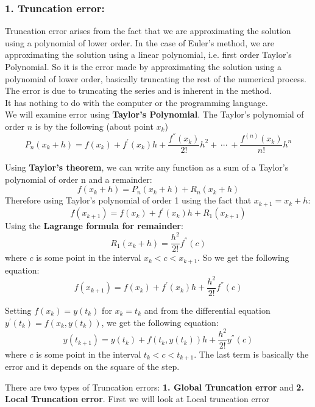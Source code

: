 \documentclass[11pt,a4paper]{amsart}
\begin{document}
\subsubsection*{1. Truncation error: \cite{buchanan, burden}}
Truncation error arises from the fact that we are approximating the solution using a polynomial of lower order. In the case of Euler's method, we are approximating the solution using a linear polynomial, i.e. first order Taylor's Polynomial.
So it is the error made by approximating the solution using a polynomial of lower order, basically truncating the rest of the numerical process. The error is due to truncating the series and is inherent in the method.\\ It has nothing to do with the computer or the programming language.\\
We will examine error using {\bf Taylor's Polynomial}. The Taylor's polynomial of order $n$ is by the following (about point $x_k$)\cite{thomas, burden}
$$P_n(x_k + h) = f(x_k) + f^{'}(x_k)h + \frac{f^{''}(x_k)}{2!}h^2 + \ \cdots \ + \frac{f^{(n)}(x_k)}{n!}h^n$$

Using {\bf Taylor's theorem}, we can write any function as a sum of a Taylor's polynomial of order n and a remainder:
$$f(x_k + h) = P_n(x_k + h) + R_n(x_k + h)$$
Therefore using Taylor's polynomial of order 1 using the fact that $x_{k+1} = x_k + h$:
$$f(x_{k + 1}) = f(x_k) + f^{'}(x_k)h + R_1(x_{k+1})$$
Using the {\bf Lagrange formula for remainder}\cite{thomas}:
$$R_1(x_k + h) = \frac{h^2}{2!}f^{''}(c)$$
where $c$ is some point in the interval $x_k < c < x_{k+1}$. 
So we get the following equation:
$$f(x_{k + 1}) = f(x_k) + f^{'}(x_k)h + \frac{h^2}{2!}f^{''}(c)$$

Setting $f(x_k) = y(t_k)$ for $x_k = t_k$ and from the differential equation $y^{'}(t_k) = f(x_k, y(t_k))$, we get the following equation:
$$y(t_{k+1}) = y(t_k) + f(t_k, y(t_k))h + \frac{h^2}{2!}y^{''}(c)$$
where $c$ is some point in the interval $t_k < c < t_{k+1}$.
The last term is basically the error and it depends on the square of the step.

There are two types of Truncation errors: \textbf{1. Global Truncation error} and \textbf{2. Local Truncation error}.
First we will look at Local truncation error
\end{document}
